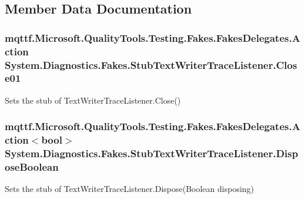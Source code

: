 \subsection{Member Data Documentation}
\hypertarget{class_system_1_1_diagnostics_1_1_fakes_1_1_stub_text_writer_trace_listener_a0266e81857875ef57e138bf7eb8fab18}{
\subsubsection[{Close01}]{\setlength{\rightskip}{0pt plus 5cm}mqttf.\-Microsoft.\-Quality\-Tools.\-Testing.\-Fakes.\-Fakes\-Delegates.\-Action System.\-Diagnostics.\-Fakes.\-Stub\-Text\-Writer\-Trace\-Listener.\-Close01}}\label{class_system_1_1_diagnostics_1_1_fakes_1_1_stub_text_writer_trace_listener_a0266e81857875ef57e138bf7eb8fab18}


Sets the stub of Text\-Writer\-Trace\-Listener.\-Close()

\hypertarget{class_system_1_1_diagnostics_1_1_fakes_1_1_stub_text_writer_trace_listener_a369115082d3e84038b42b05f2634a2be}{
\subsubsection[{Dispose\-Boolean}]{\setlength{\rightskip}{0pt plus 5cm}mqttf.\-Microsoft.\-Quality\-Tools.\-Testing.\-Fakes.\-Fakes\-Delegates.\-Action$<$bool$>$ System.\-Diagnostics.\-Fakes.\-Stub\-Text\-Writer\-Trace\-Listener.\-Dispose\-Boolean}}\label{class_system_1_1_diagnostics_1_1_fakes_1_1_stub_text_writer_trace_listener_a369115082d3e84038b42b05f2634a2be}


Sets the stub of Text\-Writer\-Trace\-Listener.\-Dispose(\-Boolean disposing)


